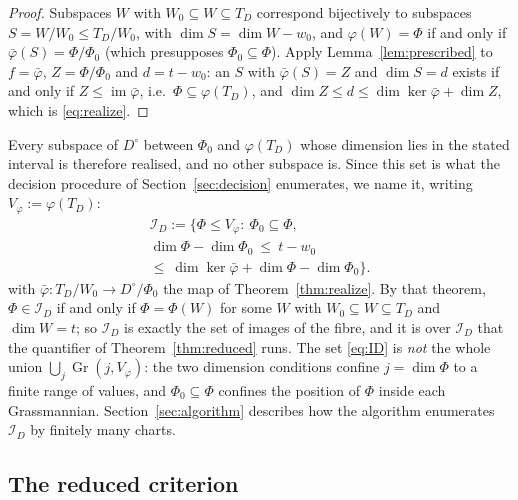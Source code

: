 \documentclass[journal]{IEEEtran}
\theoremstyle{plainn}
\theoremstyle{remark}
\newcommand{\Gr}{\operatorname{Gr}}
\begin{document}
\begin{proof}
Subspaces $W$ with $W_0\subseteq W\subseteq T_D$ correspond bijectively to subspaces
$S=W/W_0\le T_D/W_0$, with $\dim S=\dim W-w_0$, and $\varphi(W)=\Phi$ if and only if
$\bar\varphi(S)=\Phi/\Phi_0$ (which presupposes $\Phi_0\subseteq\Phi$). Apply
Lemma~\ref{lem:prescribed} to $f=\bar\varphi$, $Z=\Phi/\Phi_0$ and $d=t-w_0$: an $S$ with
$\bar\varphi(S)=Z$ and $\dim S=d$ exists if and only if $Z\le\operatorname{im}\bar\varphi$, i.e.\
$\Phi\subseteq\varphi(T_D)$, and
$\dim Z\le d\le\dim\ker\bar\varphi+\dim Z$, which is \eqref{eq:realize}.
\end{proof}

Every subspace of $D^\circ$ between $\Phi_0$ and $\varphi(T_D)$ whose dimension lies in the stated interval
is therefore realised, and no other subspace is. Since this set is what the decision procedure of
Section~\ref{sec:decision} enumerates, we name it, writing $V_\varphi:=\varphi(T_D)$:
\begin{equation}\label{eq:ID}
\begin{gathered}
\mathcal I_D:=\bigl\{\Phi\le V_\varphi:\ \Phi_0\subseteq\Phi,\\
\dim\Phi-\dim\Phi_0\ \le\ t-w_0\\
\le\ \dim\ker\bar\varphi+\dim\Phi-\dim\Phi_0\bigr\}.
\end{gathered}
\end{equation}
with $\bar\varphi:T_D/W_0\to D^\circ/\Phi_0$ the map of Theorem~\ref{thm:realize}. By that theorem,
$\Phi\in\mathcal I_D$ if and only if $\Phi=\Phi(W)$ for some $W$ with $W_0\subseteq W\subseteq T_D$ and
$\dim W=t$; so $\mathcal I_D$ is exactly the set of images of the fibre, and it is over $\mathcal I_D$ that
the quantifier of Theorem~\ref{thm:reduced} runs. The set \eqref{eq:ID} is \emph{not} the whole union
$\bigcup_j\Gr(j,V_\varphi)$: the two dimension conditions confine $j=\dim\Phi$ to a finite range of values,
and $\Phi_0\subseteq\Phi$ confines the position of $\Phi$ inside each Grassmannian.
Section~\ref{sec:algorithm} describes how the algorithm enumerates $\mathcal I_D$ by finitely many charts.


\subsection{The reduced criterion}\label{sec:reduction:c}
\end{document}
